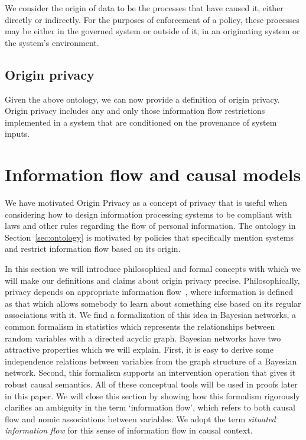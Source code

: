 \documentclass[../thesis.tex]{subfiles}
\begin{document}
We consider the origin of data to be the processes
that have caused it, either directly or indirectly.
For the purposes of enforcement of a policy, these processes
may be either in the governed system or outside of it,
in an originating system or the system's environment.

\subsection{Origin privacy}

Given the above ontology, we can now provide a definition
of origin privacy.
Origin privacy includes any and only those information
flow restrictions implemented in a system that are conditioned
on the provenance of system inputs.
 
\section{Information flow and causal models}
\label{sec:causality}

We have motivated Origin Privacy as a concept of privacy
that is useful when considering how to design
information processing systems to be compliant with
laws and other rules regarding the flow of personal 
information.
The ontology in Section~\ref{sec:ontology} is motivated
by policies that specifically mention systems and
restrict information flow based on its origin.

In this section we will introduce philosophical and formal
concepts with which we will make our definitions and claims
about origin privacy precise.
Philosophically, privacy depends on appropriate
information flow~\cite{nissenbaum09book}, where information is defined
as that which allows somebody to learn about something else
based on its regular associations with it.
We find a formalization of this idea in Bayesian networks,
a common formalism in statistics which represents the
relationships between random variables with a directed
acyclic graph.
Bayesian networks have two attractive properties which
we will explain.
First, it is easy to derive some independence relations
between variables from the graph structure of a Bayesian
network.
Second, this formalism supports an intervention operation
that gives it robust causal semantics.
All of these conceptual tools will be used in proofs
later in this paper.
We will close this section by showing how this formalism
rigorously clarifies an ambiguity in the term `information flow',
which refers to both causal flow and nomic associations between
variables.
We adopt the term \textit{situated information flow} for this
sense of information flow in causal context.
\end{document}
